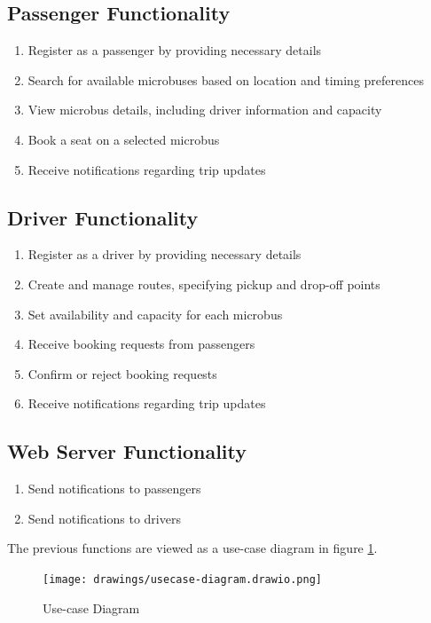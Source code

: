 \documentclass{BusMateSRS}
\begin{document}
\subsection{Passenger Functionality}
\begin{enumerate}
	\item Register as a passenger by providing necessary details
	\item Search for available microbuses based on location and timing preferences
	\item View microbus details, including driver information and capacity
	\item Book a seat on a selected microbus
	\item Receive notifications regarding trip updates
\end{enumerate}

\subsection{Driver Functionality}
\begin{enumerate}
	\item Register as a driver by providing necessary details
	\item Create and manage routes, specifying pickup and drop-off points
	\item Set availability and capacity for each microbus
	\item Receive booking requests from passengers
	\item Confirm or reject booking requests
	\item Receive notifications regarding trip updates
\end{enumerate}

\subsection{Web Server Functionality}
\begin{enumerate}
	\item Send notifications to passengers
	\item Send notifications to drivers
\end{enumerate}

The previous functions are viewed as a use-case diagram in
figure \ref{fig:usecase-diagram}.

\begin{figure}[ht!]
	\begin{center}
		\texttt{[image: drawings/usecase-diagram.drawio.png]}
	\end{center}
	\caption{Use-case Diagram}
	\label{fig:usecase-diagram}
\end{figure}
\end{document}
